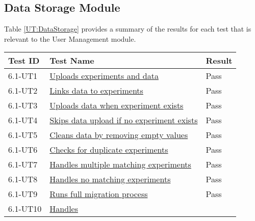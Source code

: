 \documentclass[12pt, titlepage]{article}
\begin{document}
\subsection{Data Storage Module}
Table \ref{UT:DataStorage} provides a summary of the results for each test that
is relevant to the User Management module.
\begin{table}[H]
  \centering
  \begin{tabular}{|l|l|l|}
    \hline
    \textbf{Test ID} & \textbf{Test Name} & \textbf{Result}\\
    \hline
    6.1-UT1 &
    \href{https://github.com/SumanyaG/Alkalytics/blob/main/src/backend/test/migrationServiceTest.py}{Uploads
    experiments and data} & Pass \\
    \hline
    6.1-UT2 &
    \href{https://github.com/SumanyaG/Alkalytics/blob/main/src/backend/test/migrationServiceTest.py}{Links
    data to experiments} & Pass \\
    \hline
    6.1-UT3 &
    \href{https://github.com/SumanyaG/Alkalytics/blob/main/src/backend/test/migrationServiceTest.py}{Uploads
    data when experiment exists} & Pass \\
    \hline
    6.1-UT4 &
    \href{https://github.com/SumanyaG/Alkalytics/blob/main/src/backend/test/migrationServiceTest.py}{Skips
    data upload if no experiment exists} & Pass \\
    \hline
    6.1-UT5 &
    \href{https://github.com/SumanyaG/Alkalytics/blob/main/src/backend/test/migrationServiceTest.py}{Cleans
    data by removing empty values} & Pass \\
    \hline
    6.1-UT6 &
    \href{https://github.com/SumanyaG/Alkalytics/blob/main/src/backend/test/migrationServiceTest.py}{Checks
    for duplicate experiments} & Pass \\
    \hline
    6.1-UT7 &
    \href{https://github.com/SumanyaG/Alkalytics/blob/main/src/backend/test/migrationServiceTest.py}{Handles
    multiple matching experiments} & Pass \\
    \hline
    6.1-UT8 &
    \href{https://github.com/SumanyaG/Alkalytics/blob/main/src/backend/test/migrationServiceTest.py}{Handles
    no matching experiments} & Pass \\
    \hline
    6.1-UT9 &
    \href{https://github.com/SumanyaG/Alkalytics/blob/main/src/backend/test/migrationServiceTest.py}{Runs
    full migration process} & Pass \\
    \hline
    6.1-UT10 &
    \href{https://github.com/SumanyaG/Alkalytics/blob/main/src/backend/test/migrationServiceTest.py}{Handles
}
\end{tabular}
\end{table}
\end{document}

